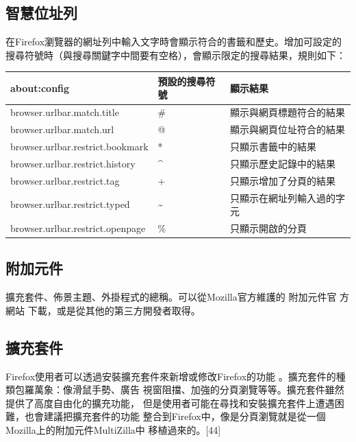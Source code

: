 \documentclass[12pt, a4paper, twoside]{article}
\begin{document}
\subsection{智慧位址列}

在Firefox瀏覽器的網址列中輸入文字時會顯示符合的書籤和歷史。增加可設定的
搜尋符號時（與搜尋關鍵字中間要有空格），會顯示限定的搜尋結果，規則如下：

\begin{adjustbox}{center}
\footnotesize\linespread{1.2}\centering\begin{tabular}{lll} \hline
about:config &  預設的搜尋符號 & 顯示結果\\ \hline
browser.urlbar.match.title & \# & 顯示與網頁標題符合的結果\\
browser.urlbar.match.url & @ & 顯示與網頁位址符合的結果\\
browser.urlbar.restrict.bookmark & * & 只顯示書籤中的結果\\
browser.urlbar.restrict.history & \^{} & 只顯示歷史記錄中的結果\\
browser.urlbar.restrict.tag & + & 只顯示增加了分頁的結果\\
browser.urlbar.restrict.typed & \~{} & 只顯示在網址列輸入過的字元\\
browser.urlbar.restrict.openpage & \% & 只顯示開啟的分頁\\ \hline
\end{tabular}
\end{adjustbox}

\subsection{附加元件}

擴充套件、佈景主題、外掛程式的總稱。可以從Mozilla官方維護的 附加元件官
方網站 下載，或是從其他的第三方開發者取得。

\subsection{擴充套件}

Firefox使用者可以透過安裝擴充套件來新增或修改Firefox的功能
。擴充套件的種類包羅萬象：像滑鼠手勢、廣告
視窗阻擋、加強的分頁瀏覽等等。擴充套件雖然提供了高度自由化的擴充功能，
但是使用者可能在尋找和安裝擴充套件上遭遇困難，也會建議把擴充套件的功能
整合到Firefox中，像是分頁瀏覽就是從一個Mozilla上的附加元件MultiZilla中
移植過來的。[44]
\end{document}
